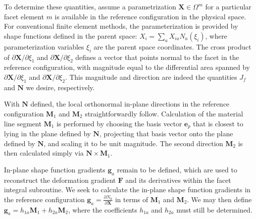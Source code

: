 To determine these quantities, assume a parametrization $\bm{X} \in \Omega^m$ for a particular facet element $m$ is available in the reference configuration in the physical space. For conventional finite element methods, the parameterization is provided by shape functions defined in the parent space: ${X}_{i} = \sum\limits_{a}{X}_{ia}{N}_a(\xi_i)$, where parameterization variables $\xi_i$ are the parent space coordinates. The cross product of ${\partial{\bm {X}}}/{\partial \xi_1}$ and ${\partial{\bm {X}}}/{\partial \xi_2}$ defines a vector that points normal to the facet in the reference configuration, with magnitude equal to the differential area spanned by ${\partial{\bm {X}}}/{\partial \xi_1}$ and ${\partial{\bm {X}}}/{\partial \xi_2}$. This magnitude and direction are indeed the quantities $J_f$ and ${\bm {N}}$ we desire, respectively.

With $\bm{N}$ defined, the local orthonormal in-plane directions in the reference configuration $\bm{M}_1$ and $\bm{M}_2$ straightforwardly follow. Calculation of the material line segment ${\bm {M}}_1$ is performed by choosing the basis vector ${\bm {e}}_p$ that is closest to lying in the plane defined by ${\bm N}$, projecting that basis vector onto the plane defined by $\bm{N}$, and scaling it to be unit magnitude. The second direction ${\bm M}_2$ is then calculated simply via ${\bm {N}} \times {\bm {M}}_1$.

In-plane shape function gradients $\bm{g}_a$ remain to be defined, which are used to reconstruct the deformation gradient $\bm{F}$ and its derivatives within the facet integral subroutine. We seek to calculate the in-plane shape function gradients in the reference configuration $\bm{g}_a = \frac{\partial N_a}{\partial \bm{X}}$ in terms of $\bm{M}_1$ and $\bm{M}_2$. We may then define ${\bm {g}}_a = {h_{1a}}{\bm {M}}_1 + {h_{2a}}{\bm {M}}_2$, where the coefficients $h_{1a}$ and $h_{2a}$ must still be determined.

